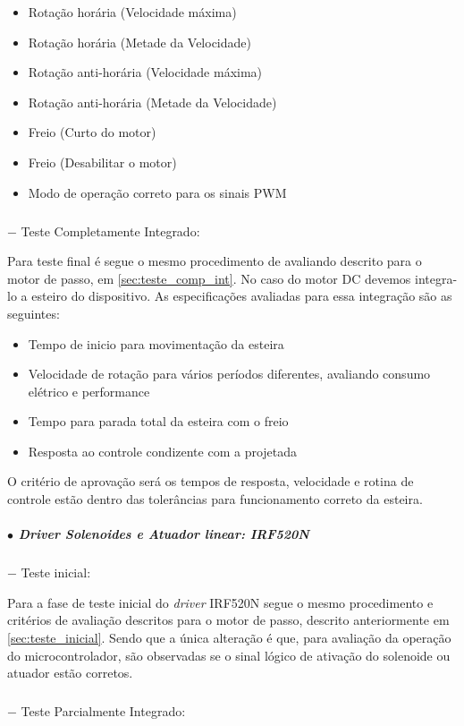 \begin{itemize}
    \item Rotação horária (Velocidade máxima)
    \item Rotação horária (Metade da Velocidade)
    \item Rotação anti-horária  (Velocidade máxima)
    \item Rotação anti-horária  (Metade da Velocidade)
    \item Freio (Curto do motor)
    \item Freio (Desabilitar o motor)
    \item Modo de operação correto para os sinais PWM
\end{itemize}

\subparagraph*{} $-$ Teste Completamente Integrado:

Para teste final é segue o mesmo procedimento de avaliando descrito para o motor de passo, em \ref{sec:teste_comp_int}. No caso do motor DC devemos integra-lo a esteiro do dispositivo. As especificações avaliadas para essa integração são as seguintes:

\begin{itemize}
    \item Tempo de inicio para movimentação da esteira
    \item Velocidade de rotação para vários períodos diferentes, avaliando consumo elétrico e performance
    \item Tempo para parada total da esteira com o freio
    \item Resposta ao controle condizente com a  projetada
\end{itemize}

O critério de aprovação será os tempos de resposta, velocidade e rotina de controle estão dentro das tolerâncias para funcionamento correto da esteira.

\subparagraph*{$\bullet$ \textit{Driver} Solenoides e Atuador linear: IRF520N} \hfill

\subparagraph*{} $-$ Teste inicial:

Para a fase de teste inicial do \textit{driver} IRF520N segue o mesmo procedimento e critérios de avaliação descritos para o motor de passo, descrito anteriormente em \ref{sec:teste_inicial}. Sendo que a única alteração é que, para avaliação da operação do microcontrolador, são observadas se o sinal lógico de ativação do solenoide ou atuador estão corretos.

\subparagraph*{} $-$ Teste Parcialmente Integrado:

